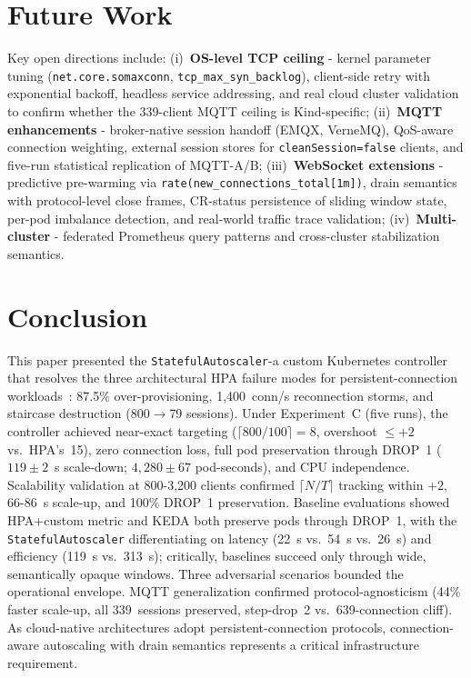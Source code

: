 \documentclass[3p,twocolumn]{elsarticle}
\theoremstyle{plain}%
\theoremstyle{definition}%
\begin{document}
\section{Future Work}
\label{sec:future_work}

Key open directions include: (i)~\textbf{OS-level TCP ceiling} - kernel parameter tuning (\texttt{net.core.somaxconn}, \texttt{tcp\_max\_syn\_backlog}), client-side retry with exponential backoff, headless service addressing, and real cloud cluster validation to confirm whether the 339-client MQTT ceiling is Kind-specific; (ii)~\textbf{MQTT enhancements} - broker-native session handoff (EMQX, VerneMQ), QoS-aware connection weighting, external session stores for \texttt{cleanSession=false} clients, and five-run statistical replication of MQTT-A/B; (iii)~\textbf{WebSocket extensions} - predictive pre-warming via \texttt{rate(new\_connections\_total[1m])}, drain semantics with protocol-level close frames, CR-status persistence of sliding window state, per-pod imbalance detection, and real-world traffic trace validation; (iv)~\textbf{Multi-cluster} - federated Prometheus query patterns and cross-cluster stabilization semantics.



\section{Conclusion}
\label{sec:conclusion}

This paper presented the \texttt{StatefulAutoscaler}-a custom Kubernetes controller that resolves the three architectural HPA failure modes for persistent-connection workloads~\cite{behera2026hpa}: 87.5\% over-provisioning, 1,400~conn/s reconnection storms, and staircase destruction (800$\to$79 sessions). Under Experiment~C (five runs), the controller achieved near-exact targeting ($\lceil800/100\rceil = 8$, overshoot $\leq +2$ vs.\ HPA's~15), zero connection loss, full pod preservation through DROP~1 ($119\pm2$~s scale-down; $4{,}280\pm67$ pod-seconds), and CPU independence. Scalability validation at 800-3{,}200 clients confirmed $\lceil N/T \rceil$ tracking within $+2$, 66-86~s scale-up, and 100\% DROP~1 preservation. Baseline evaluations showed HPA+custom metric and KEDA both preserve pods through DROP~1, with the \texttt{StatefulAutoscaler} differentiating on latency (22~s vs.\ 54~s vs.\ 26~s) and efficiency (119~s vs.\ 313~s); critically, baselines succeed only through wide, semantically opaque windows. Three adversarial scenarios bounded the operational envelope. MQTT generalization confirmed protocol-agnosticism (44\% faster scale-up, all 339~sessions preserved, step-drop~2 vs.\ 639-connection cliff). As cloud-native architectures adopt persistent-connection protocols, connection-aware autoscaling with drain semantics represents a critical infrastructure requirement.
\end{document}
